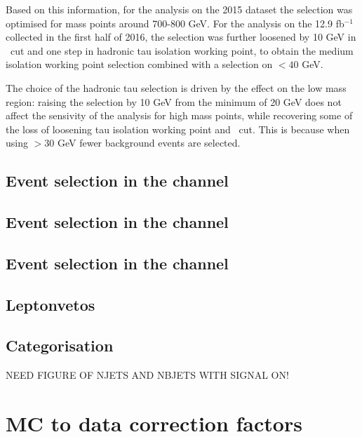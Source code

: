 Based on this information, for the analysis on the 2015 dataset the selection was optimised
for mass points around 700-800 GeV. For the analysis on the 12.9 fb$^{-1}$ collected
in the first half of 2016, the selection was further loosened by 10 GeV in \mT~cut
and one step in hadronic tau isolation working point, to obtain the medium isolation working
point selection combined with a selection on \mT$<40$ GeV.

The choice of the hadronic tau \pT selection is driven by the effect on the low mass region:
raising the \pT selection by 10 GeV from the minimum of 20 GeV does not affect the sensivity
of the analysis for high mass points, while recovering some of the loss of loosening 
tau isolation working point and \mT~cut. This is because when using \pT$>30$ GeV 
fewer background events are selected.





\subsection{\texorpdfstring{Event selection in the \etau channel}{Event selection in the e tau channel}}
\label{sec:mssm_eventsel_et}

\subsection{\texorpdfstring{Event selection in the \tautau channel}{Event selection in the tau tau channel}}
\label{sec:mssm_eventsel_tt}

\subsection{\texorpdfstring{Event selection in the \emu channel}{Event selection in the e mu channel}}
\label{sec:mssm_eventsel_em}

\subsection{Leptonvetos}
\label{sec:mssm_eventsel_leptonvetos}

\subsection{Categorisation}
\label{sec:mssm_eventsel_categories}

NEED FIGURE OF NJETS AND NBJETS WITH SIGNAL ON!

\section{\ac{MC} to data correction factors}
\label{sec:mssm_mccorrs}

